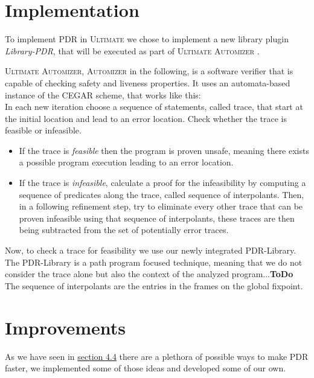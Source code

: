 \documentclass[11pt, a4paper, BCOR=10mm, ngerman]{scrbook}
\begin{document}
\section{Implementation}
To implement PDR in \textsc{Ultimate} we chose to implement a new library plugin \textsl{Library-PDR}, that will be executed as part of \textsc{Ultimate Automizer} \cite{Heizmann:2013:SMC:2526861.2526864}. \par 
\textsc{Ultimate Automizer}, \textsc{Automizer} in the following, is a software verifier that is capable of checking safety and liveness properties. It uses an automata-based \cite{DBLP:conf/cav/HeizmannHP13} instance of the CEGAR scheme, that works like this: \\
 In each new iteration choose a sequence of statements, called trace, that start at the initial location and lead to an error location. Check whether the trace is feasible or infeasible. \\
 \begin{itemize}
	\item If the trace is \textsl{feasible} then the program is proven unsafe, meaning there exists a possible program execution leading to an error location.
	\item If the trace is \textsl{infeasible}, calculate a proof for the infeasibility by computing a sequence of predicates along the trace, called sequence of interpolants. Then, in a following refinement step, try to eliminate every other trace that can be proven infeasible using that sequence of interpolants, these traces are then being subtracted from the set of potentially error traces.
 \end{itemize}
 \par
 Now, to check a trace for feasibility we use our newly integrated PDR-Library. 
 The PDR-Library is a path program focused technique, meaning that we do not consider the trace alone but also the context of the analyzed program...\textbf{ToDo} \\
 
 The sequence of interpolants are the entries in the frames on the global fixpoint.
 

\section{Improvements}
As we have seen in \hyperref[improvements]{section 4.4} there are a plethora of possible ways to make PDR faster, we implemented some of those ideas and developed some of our own.
\end{document}
